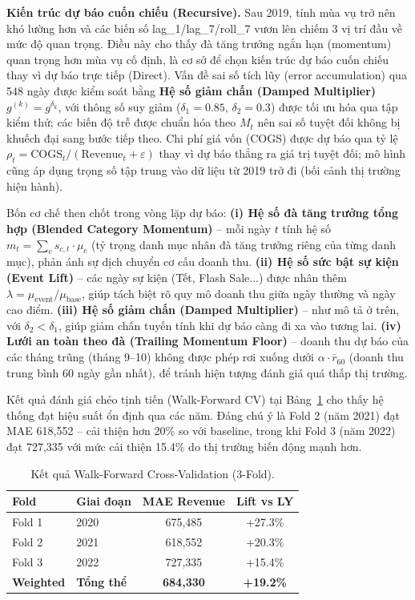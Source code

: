 \documentclass{article}
\begin{document}
\textbf{Kiến trúc dự báo cuốn chiếu (Recursive).}
Sau 2019, tính mùa vụ trở nên khó lường hơn và các biến số lag\_1/lag\_7/roll\_7
vươn lên chiếm 3 vị trí đầu về mức độ quan trọng. Điều này cho thấy đà tăng trưởng ngắn hạn (momentum) quan
trọng hơn mùa vụ cố định, là cơ sở để chọn kiến trúc dự báo cuốn chiếu thay vì dự báo trực tiếp (Direct).
Vấn đề sai số tích lũy (error accumulation) qua 548 ngày được kiểm soát bằng \textbf{Hệ số giảm chấn (Damped Multiplier)}
$g^{(k)}=g^{\delta_k}$, với thông số suy giảm ($\delta_1 = 0.85$, $\delta_2 = 0.3$) được tối ưu hóa qua tập kiểm thử; các biến độ trễ được chuẩn hóa theo $M_t$
nên sai số tuyệt đối không bị khuếch đại sang bước tiếp theo.
Chi phí giá vốn (COGS) được dự báo qua tỷ lệ $\rho_t=\text{COGS}_t/(\text{Revenue}_t+\varepsilon)$
thay vì dự báo thẳng ra giá trị tuyệt đối; mô hình cũng áp dụng trọng số tập trung vào dữ liệu từ 2019 trở đi (bối cảnh thị trường hiện hành).

Bốn cơ chế then chốt trong vòng lặp dự báo:
\textbf{(i) Hệ số đà tăng trưởng tổng hợp (Blended Category Momentum)} -- mỗi ngày $t$ tính hệ số
$m_t = \sum_c s_{c,t} \cdot \mu_c$ (tỷ trọng danh mục nhân đà tăng trưởng
riêng của từng danh mục), phản ánh sự dịch chuyển cơ cấu doanh thu.
\textbf{(ii) Hệ số sức bật sự kiện (Event Lift)} -- các ngày sự kiện (Tết, Flash Sale...) được
nhân thêm $\lambda = \mu_{\text{event}} / \mu_{\text{base}}$, giúp tách
biệt rõ quy mô doanh thu giữa ngày thường và ngày cao điểm.
\textbf{(iii) Hệ số giảm chấn (Damped Multiplier)} -- như mô tả ở trên, với $\delta_2 < \delta_1$,
giúp giảm chấn tuyến tính khi dự báo càng đi xa vào tương lai.
\textbf{(iv) Lưới an toàn theo đà (Trailing Momentum Floor)} -- doanh thu dự báo của các tháng trũng (tháng 9--10) không được phép rơi xuống dưới $\alpha \cdot \bar{r}_{60}$ (doanh thu trung bình 60 ngày gần nhất),
để tránh hiện tượng đánh giá quá thấp thị trường.

Kết quả đánh giá chéo tịnh tiến (Walk-Forward CV) tại Bảng~\ref{tab:results} cho thấy hệ thống đạt hiệu suất ổn định qua các năm. Đáng chú ý là Fold 2 (năm 2021) đạt MAE 618{,}552 -- cải thiện hơn 20\% so với baseline, trong khi Fold 3 (năm 2022) đạt 727{,}335 với mức cải thiện 15.4\% do thị trường biến động mạnh hơn.

\begin{table}[h]
\centering
\caption{Kết quả Walk-Forward Cross-Validation (3-Fold).}
\label{tab:results}
\small\setlength\tabcolsep{8pt}
\begin{tabular}{llcc}
\toprule
\textbf{Fold} & \textbf{Giai đoạn} & \textbf{MAE Revenue} & \textbf{Lift vs LY} \\
\midrule
Fold 1 & 2020 & 675{,}485 & +27.3\% \\
Fold 2 & 2021 & 618{,}552 & +20.3\% \\
Fold 3 & 2022 & 727{,}335 & +15.4\% \\
\midrule
\textbf{Weighted} & \textbf{Tổng thể} & \textbf{684{,}330} & \textbf{+19.2\%} \\
\bottomrule
\end{tabular}
\end{table}
\end{document}
